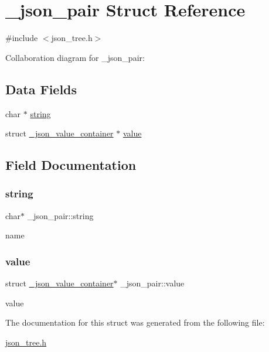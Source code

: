 \hypertarget{struct__json__pair}{}\section{\+\_\+json\+\_\+pair Struct Reference}
\label{struct__json__pair}


{\ttfamily \#include $<$json\+\_\+tree.\+h$>$}



Collaboration diagram for \+\_\+json\+\_\+pair\+:
\subsection*{Data Fields}
\begin{DoxyCompactItemize}
\item 
char $\ast$ \hyperlink{struct__json__pair_ad599f0ce62f57e7465046444953b6275}{string}
\item 
struct \hyperlink{struct__json__value__container}{\+\_\+json\+\_\+value\+\_\+container} $\ast$ \hyperlink{struct__json__pair_a70e763b09977d01bdc56afc59fd44989}{value}
\end{DoxyCompactItemize}


\subsection{Field Documentation}
\mbox{\label{struct__json__pair_ad599f0ce62f57e7465046444953b6275}} 
\subsubsection{\texorpdfstring{string}{string}}
{\footnotesize\ttfamily char$\ast$ \+\_\+json\+\_\+pair\+::string}

name \mbox{\label{struct__json__pair_a70e763b09977d01bdc56afc59fd44989}} 
\subsubsection{\texorpdfstring{value}{value}}
{\footnotesize\ttfamily struct \hyperlink{struct__json__value__container}{\+\_\+json\+\_\+value\+\_\+container}$\ast$ \+\_\+json\+\_\+pair\+::value}

value 

The documentation for this struct was generated from the following file\+:\begin{DoxyCompactItemize}
\item 
\hyperlink{json__tree_8h}{json\+\_\+tree.\+h}\end{DoxyCompactItemize}
